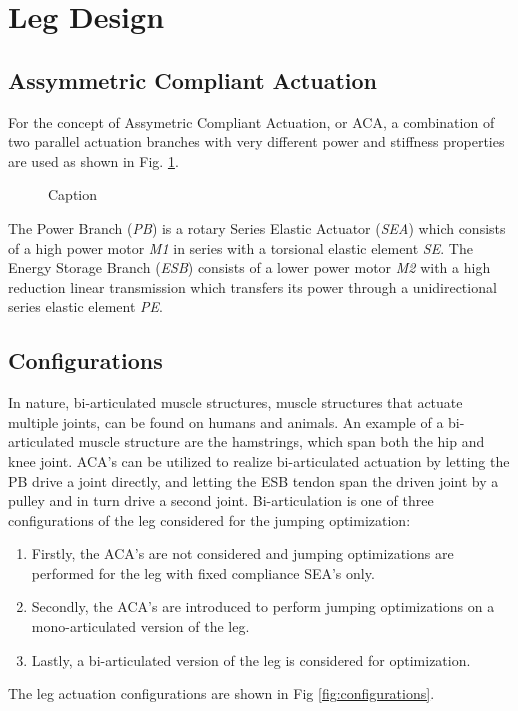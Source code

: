 \documentclass[letterpaper, 10 pt, conference]{ieeeconf}  %
\begin{document}
\section{Leg Design }

\subsection{Assymmetric Compliant Actuation}

For the concept of Assymetric Compliant Actuation, or ACA, a combination of two parallel actuation branches with very different power and stiffness properties are used as shown in Fig. \ref{fig:ACA}.

\begin{figure}[b]
	\centering
	\caption{Caption}
	\label{fig:ACA}
\end{figure}

 The Power Branch (\textit{PB}) is a rotary Series Elastic Actuator (\textit{SEA}) which consists of a high power motor \textit{M1} in series with a torsional elastic element \textit{SE}. The Energy Storage Branch (\textit{ESB}) consists of a lower power motor \textit{M2} with a high reduction linear transmission which transfers its power through a unidirectional series elastic element \textit{PE}.

\subsection{Configurations}
In nature, bi-articulated muscle structures, muscle structures that actuate multiple joints, can be found on humans and animals. An example of a bi-articulated muscle structure are the hamstrings, which span both the hip and knee joint. ACA's can be utilized to realize bi-articulated actuation by letting the PB drive a joint directly, and letting the ESB tendon span the driven joint by a pulley and in turn drive a second joint. Bi-articulation is one of three configurations of the leg considered for the jumping optimization:

  \begin{enumerate}
	\item Firstly, the ACA's are not considered and jumping optimizations are performed for the leg with fixed compliance SEA's only.
	\item Secondly, the ACA's are introduced to perform jumping optimizations on a mono-articulated version of the leg. 
	\item Lastly, a bi-articulated version of the leg is considered for optimization.
\end{enumerate}
The leg actuation configurations are shown in Fig \ref{fig:configurations}.
\end{document}
